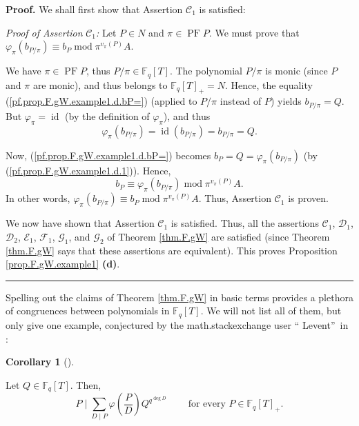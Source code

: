 \documentclass[numbers=enddot,12pt,final,onecolumn,notitlepage]{scrartcl}%
\theoremstyle{definition}
\newtheorem{coro}[theo]{Corollary}
\newenvironment{corollary}[1][]
{\begin{coro}[#1]\begin{leftbar}}
{\end{leftbar}\end{coro}}
\newenvironment{proof}[1][Proof]{\noindent\textbf{#1.} }{\ \rule{0.5em}{0.5em}}
\let\sumnonlimits\sum
\renewcommand{\sum}{\sumnonlimits\limits}
\begin{document}
\begin{proof}
We shall first show that Assertion $\mathcal{C}_{1}$ is satisfied:

\textit{Proof of Assertion }$\mathcal{C}_{1}$\textit{:} Let $P\in N$ and
$\pi\in\operatorname*{PF}P$. We must prove that $\varphi_{\pi}\left(
b_{P/\pi}\right)  \equiv b_{P}\operatorname{mod}\pi^{v_{\pi}\left(  P\right)
}A$.

We have $\pi\in\operatorname*{PF}P$, thus $P/\pi\in\mathbb{F}_{q}\left[
T\right]  $. The polynomial $P/\pi$ is monic (since $P$ and $\pi$ are monic),
and thus belongs to $\mathbb{F}_{q}\left[  T\right]  _{+}=N$. Hence, the
equality (\ref{pf.prop.F.gW.example1.d.bP=}) (applied to $P/\pi$ instead of
$P$) yields $b_{P/\pi}=Q$. But $\varphi_{\pi}=\operatorname*{id}$ (by the
definition of $\varphi_{\pi}$), and thus%
\begin{equation}
\varphi_{\pi}\left(  b_{P/\pi}\right)  =\operatorname*{id}\left(  b_{P/\pi
}\right)  =b_{P/\pi}=Q.\label{pf.prop.F.gW.example1.d.1}%
\end{equation}


Now, (\ref{pf.prop.F.gW.example1.d.bP=}) becomes $b_{P}=Q=\varphi_{\pi}\left(
b_{P/\pi}\right)  $ (by (\ref{pf.prop.F.gW.example1.d.1})). Hence,%
\[
b_{P}\equiv\varphi_{\pi}\left(  b_{P/\pi}\right)  \operatorname{mod}%
\pi^{v_{\pi}\left(  P\right)  }A.
\]
In other words, $\varphi_{\pi}\left(  b_{P/\pi}\right)  \equiv b_{P}%
\operatorname{mod}\pi^{v_{\pi}\left(  P\right)  }A$. Thus, Assertion
$\mathcal{C}_{1}$ is proven.

We now have shown that Assertion $\mathcal{C}_{1}$ is satisfied. Thus, all the
assertions $\mathcal{C}_{1}$, $\mathcal{D}_{1}$, $\mathcal{D}_{2}$,
$\mathcal{E}_{1}$, $\mathcal{F}_{1}$, $\mathcal{G}_{1}$, and $\mathcal{G}_{2}$
of Theorem \ref{thm.F.gW} are satisfied (since Theorem \ref{thm.F.gW} says
that these assertions are equivalent). This proves Proposition
\ref{prop.F.gW.example1} \textbf{(d)}.
\end{proof}

Spelling out the claims of Theorem \ref{thm.F.gW} in basic terms provides a
plethora of congruences between polynomials in $\mathbb{F}_{q}\left[
T\right]  $. We will not list all of them, but only give one example,
conjectured by the math.stackexchange user \textquotedblleft
Levent\textquotedblright\ in \cite{levent}:

\begin{corollary}
\label{cor.F.gW.example1.levent}Let $Q\in\mathbb{F}_{q}\left[  T\right]  $.
Then,%
\[
P\mid\sum_{D\mid P}\varphi\left(  \dfrac{P}{D}\right)  Q^{q^{\deg D}%
}\ \ \ \ \ \ \ \ \ \ \text{for every }P\in\mathbb{F}_{q}\left[  T\right]
_{+}.
\]

\end{corollary}
\end{document}
